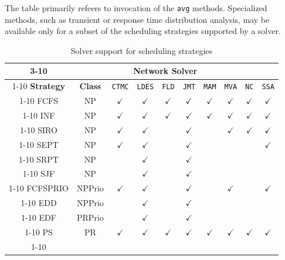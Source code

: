 The table primarily refeers to invocation of the \texttt{avg} methods. Specialized methods, such as transient or response time distribution analysis, may be available only for a subset of the scheduling strategies supported by a solver.
\begin{table}[thbp]
\renewcommand{\arraystretch}{1.2}
\centering
\caption{Solver support for scheduling strategies}
{\small
\begin{tabular}{|c|c|c|c|c|c|c|c|c|c|}
\cline{3-10}
\multicolumn{2}{c|}{}&\multicolumn{8}{c|}{\textbf{Network Solver}}\\
\cline{1-10}
\textbf{Strategy}	&\textbf{Class}	&\texttt{CTMC}&\texttt{LDES}&\texttt{FLD} 	&\texttt{JMT} 	&\texttt{MAM}	&\texttt{MVA}	&\texttt{NC}	&\texttt{SSA}	\\
\cline{1-10}
FCFS &NP	&$\checkmark$	&$\checkmark$	&$\checkmark$	&  $\checkmark$	 	&  $\checkmark$	 & $\checkmark$	&  $\checkmark$		&  $\checkmark$	 \\
\cline{1-10}
INF	&NP	&$\checkmark$	&$\checkmark$	&$\checkmark$	&  $\checkmark$		& 	$\checkmark$ & $\checkmark$ 	&  $\checkmark$		&  $\checkmark$	 \\
\cline{1-10}
SIRO 	&NP	&	$\checkmark$	&$\checkmark$ &	& $\checkmark$	&	&$\checkmark$	& $\checkmark$	& $\checkmark$	\\
\cline{1-10}
SEPT 	&NP	&		$\checkmark$&$\checkmark$ &	&$\checkmark$&	& &&$\checkmark$	\\
\cline{1-10}
SRPT 	&NP	&			&$\checkmark$ &	& $\checkmark$	&&&&	\\
\cline{1-10}
SJF 	&NP	&			&$\checkmark$ &	& $\checkmark$	&&&&	\\
\cline{1-10}
FCFSPRIO & NPPrio &		 $\checkmark$	&$\checkmark$ & 	&$\checkmark$	& & $\checkmark$ && $\checkmark$	\\
\cline{1-10}
EDD & NPPrio &			&$\checkmark$ & 	&$\checkmark$	& & && 	\\
\cline{1-10}
EDF & PRPrio &			&$\checkmark$ & 	&$\checkmark$	& & && 	\\
\cline{1-10}
PS	&  PR	&$\checkmark$	&$\checkmark$ &$\checkmark$	&  $\checkmark$		& $\checkmark$ &  $\checkmark$	  	& $\checkmark$	& $\checkmark$	  \\
\cline{1-10}

\end{tabular}}
\end{table}
